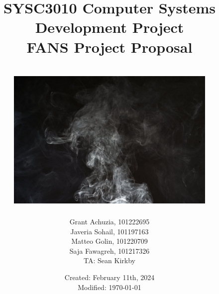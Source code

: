 \documentclass[11pt]{article}
\author{
    Grant Achuzia, 101222695 \\
    Javeria Sohail, 101197163 \\
    Matteo Golin, 101220709 \\
    Saja Fawagreh, 101217326 \\
    TA: Sean Kirkby
}
\title{
    SYSC3010 Computer Systems Development Project \\
    FANS Project Proposal \\
    \medium{Group L1-G8} \\
    {
        \vspace{0.5in}
        \centering
        \includegraphics[width=4in]{../assets/header-image.jpg}
    }
}
\date{
    Created: February 11th, 2024 \\
    Modified: \today
}
\begin{document}
\maketitle
\pagebreak

\tableofcontents







\pagebreak
\printbibliography

\pagebreak

\end{document}
